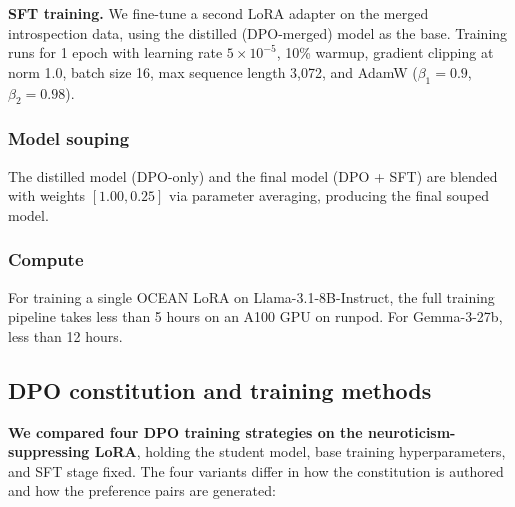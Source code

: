 \textbf{SFT training.} We fine-tune a second LoRA adapter on the merged introspection data, using the distilled (DPO-merged) model as the base. Training runs for 1 epoch with learning rate $5 \times 10^{-5}$, 10\% warmup, gradient clipping at norm 1.0, batch size 16, max sequence length 3,072, and AdamW ($\beta_1 = 0.9$, $\beta_2 = 0.98$).

\subsubsection{Model souping}

The distilled model (DPO-only) and the final model (DPO + SFT) are blended with weights $[1.00, 0.25]$ via parameter averaging, producing the final souped model.

\subsubsection{Compute}
For training a single OCEAN LoRA on Llama-3.1-8B-Instruct, the full training pipeline takes less than 5 hours on an A100 GPU on runpod. For Gemma-3-27b, less than 12 hours.


\subsection{DPO constitution and training methods}\label{sec:appendix-b-dpo-methods}

\textbf{We compared four DPO training strategies on the neuroticism-suppressing LoRA}, holding the student model, base training hyperparameters, and SFT stage fixed. The four variants differ in how the constitution is authored and how the preference pairs are generated:


